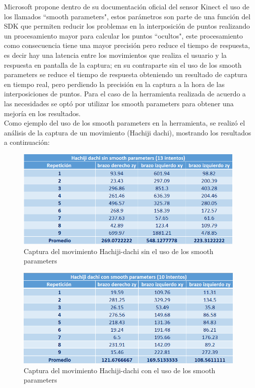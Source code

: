 Microsoft propone dentro de su documentación oficial del sensor Kinect el uso de los llamados ``smooth parameters", estos parámetros son parte de una función del SDK que permiten reducir los problemas en la interposición de puntos realizando un procesamiento mayor para calcular los puntos ``ocultos", este procesamiento como consecuencia tiene una mayor precisión pero reduce el tiempo de respuesta, es decir hay una latencia entre los movimientos que realiza el usuario y la respuesta en pantalla de la captura; en su contraparte sin el uso de los smooth parameters se reduce el tiempo de respuesta obteniendo un resultado de captura en tiempo real, pero perdiendo la precisión en la captura a la hora de las interposiciones de puntos. Para el caso de la herramienta realizada de acuerdo a las necesidades se optó por utilizar los smooth parameters para obtener una mejoría en los resultados.\\

Como ejemplo del uso de los smooth parameters en la herramienta, se realizó el análisis de la captura de un movimiento (Hachiji dachi), mostrando los resultados a continuación:\\

\begin{figure}[H]
	\begin{center}
		\includegraphics[scale=0.70]{./Figuras/Implementacion/SmoothParameters/HachijiDachiSinSmooth}
	\end{center}
	\caption{Captura del movimiento Hachiji-dachi sin el uso de los smooth parameters}
	\label{fig:Hachijidachi_sin_smooth_parameters}
\end{figure}
\begin{figure}[H]
	\begin{center}
		\includegraphics[scale=0.70]{./Figuras/Implementacion/SmoothParameters/HachijiDachiConSmooth}
	\end{center}
	\caption{Captura del movimiento Hachiji-dachi con el uso de los smooth parameters}
	\label{fig:Hachijidachi_con_smooth_parameters}
\end{figure}

